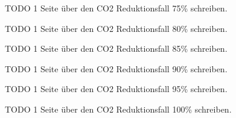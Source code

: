 \newcommand{\reduktion}{75}



TODO 1 Seite über den  CO2 Reduktionsfall \reduktion\space\% schreiben.



\renewcommand{\reduktion}{80}



TODO 1 Seite über den  CO2 Reduktionsfall \reduktion\space\% schreiben.



\renewcommand{\reduktion}{85}



TODO 1 Seite über den  CO2 Reduktionsfall \reduktion\space\% schreiben.



\renewcommand{\reduktion}{90}



TODO 1 Seite über den  CO2 Reduktionsfall \reduktion\space\% schreiben.



\renewcommand{\reduktion}{95}



TODO 1 Seite über den  CO2 Reduktionsfall \reduktion\space\% schreiben.



\renewcommand{\reduktion}{100}



TODO 1 Seite über den  CO2 Reduktionsfall \reduktion\space\% schreiben.